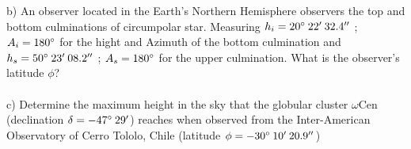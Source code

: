 \noindent{}
\noindent
b) An observer located in the Earth's Northern Hemisphere observers the top and bottom culminations of
circumpolar star. Measuring $h_i = 20 \degree \: 22' \: 32.4''$ ; $A_i = 180 \degree$ for the hight and
Azimuth of the bottom culmination and $h_s = 50 \degree \: 23' \: 08.2''$ ; $A_s = 180 \degree$ for the
upper culmination. What is the observer's latitude $\phi$?\\
\\
\noindent
c) Determine the maximum height in the sky that the globular cluster $\omega$Cen (declination 
$\delta = -47 \degree \: 29'$) reaches when observed from the Inter-American Observatory of Cerro Tololo,
Chile (latitude $\phi = -30 \degree \: 10' \: 20.9''$)\\
\\
